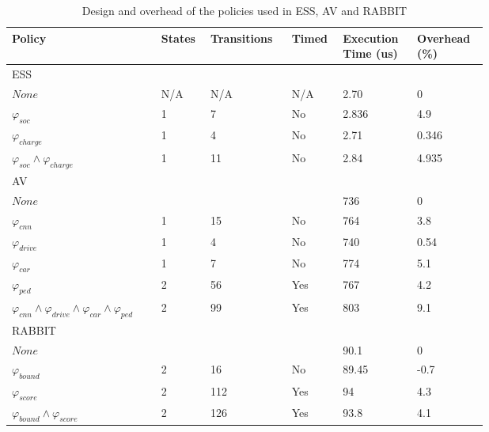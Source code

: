 \begin{table}[t]
	\centering
	\caption{Design and overhead of the policies used in \ac{ESS}, \ac{AV} and RABBIT}
	\label{table:policies}
	\begin{tabular}{|p{0.25\linewidth}|p{0.06\linewidth}|p{0.12\linewidth}|p{0.06\linewidth}|p{0.11\linewidth}|p{0.1\linewidth}|}
		\hline Policy & States & Transitions & Timed & Execution Time (us) & Overhead (\%) \\ \hline
		\multicolumn{6}{|p{0.70\linewidth}|}{\ac{ESS}} \\ \hline 
		$None$ 										& N/A & N/A & N/A & 2.70 & 0 \\ 	
		$\varphi_{soc}$    							& 1 & 7 & No & 2.836 & 4.9 \\
		$\varphi_{charge}$    						& 1 & 4 & No & 2.71 & 0.346 \\
		$\varphi_{soc} \wedge \varphi_{charge}$  	& 1 & 11 & No & 2.84 & 4.935 \\ \hline       
		\multicolumn{6}{|p{0.70\linewidth}|}{\ac{AV}} \\ \hline
		$None$ 						&  &  &  & 736 & 0 \\
		$\varphi_{cnn}$ 			& 1 & 15 & No & 764 & 3.8 \\
		$\varphi_{drive}$ 			& 1 & 4 & No & 740 & 0.54 \\
		$\varphi_{car}$ 			& 1 & 7 & No & 774 & 5.1 \\
		$\varphi_{ped}$ 			& 2 & 56 & Yes & 767 & 4.2 \\
		$\varphi_{cnn} \wedge \varphi_{drive} \wedge \varphi_{car} \wedge \varphi_{ped}$ 	
		& 2 & 99 & Yes & 803 & 9.1 \\ \hline       
		\multicolumn{6}{|p{0.70\linewidth}|}{RABBIT} \\ \hline
		$None$ 										&  &  &  & 90.1 & 0 \\ 
		$\varphi_{bound}$ 							& 2 & 16 & No & 89.45 & -0.7 \\
		$\varphi_{score}$ 							& 2 & 112 & Yes & 94 & 4.3 \\
		$\varphi_{bound} \wedge \varphi_{score}$ 	& 2 & 126 & Yes & 93.8 & 4.1 \\ \hline      
	\end{tabular}
\end{table}


